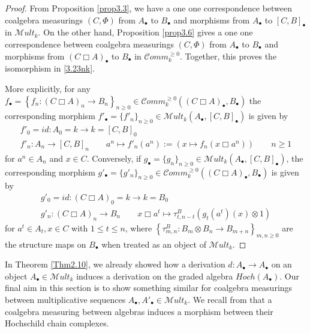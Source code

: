 \documentclass[10pt, colorlinks]{article}
\numberwithin{equation}{section} \DeclareMathSizes{2}{10}{12}{13}
\begin{document}
    \begin{proof} 
    
     From Proposition \ref{prop3.3}, we have a one one correspondence between coalgebra measurings $(C,\Phi)$ from $A_\bullet$ to $B_\bullet$ and morphisms from $A_\bullet$ to $[C,B]_\bullet$ in $\mathscr Mult_k$. On the other hand, Proposition \ref{prop3.6} gives a one one  correspondence between coalgebra measurings $(C,\Phi)$ from $A_\bullet$ to $B_\bullet$ and morphisms from $(C\Box A)_\bullet$ to $B_\bullet$ in $\mathcal Comm_k^{\geq 0}$.  Together, this proves the isomorphism in \eqref{3.23nk}. 
     
     \smallskip
      More explicitly, for any $f_\bullet=\left\{f_n:(C\Box A)_n\longrightarrow B_n\right\}_{n\geq 0}\in \mathcal Comm_k^{\geq 0}\left((C\Box A)_\bullet,B_\bullet\right)$ the corresponding morphism $f'_\bullet=\{f'_n\}_{n\geq 0}\in {\mathscr Mult_k}\left(A_\bullet, [C,B]_\bullet\right)$ is given by
     \begin{equation*}
     \begin{array}{c}
        f'_0=id:A_0=k\longrightarrow k=[C,B]_0\\
           f'_n:A_n\longrightarrow  [C,B]_n\qquad a^n\mapsto f'_n(a^n):=(x\longmapsto f_n(x\Box {a^n}))\qquad n\geq 1
     \end{array}     
     \end{equation*}
     for $a^n\in A_n$ and $x\in C$. 
    Conversely, if $g_\bullet=\{g_n\}_{n\geq 0}\in {\mathscr Mult_k}(A_\bullet, [C,B]_\bullet)$,  the corresponding morphism $g'_\bullet=\{g'_n\}_{n\geq 0}\in \mathcal Comm_k^{\geq 0}\left((C\Box A)_\bullet,B_\bullet\right)$ is  given by
     \begin{equation*}
         \begin{array}{c}
         g'_0=id:(C\Box A)_0=k\longrightarrow k=B_0 \\
            g'_n:(C\Box A)_n\longrightarrow B_n\qquad x\Box a^t\mapsto \tau^B_{t,n-t}(g_t(a^t)(x)\otimes 1)
         \end{array}
     \end{equation*}
     for $a^t\in A_t,x\in C$ with $1\leq t\leq n$, where $\left\{\tau^B_{m,n}:B_m\otimes B_n\longrightarrow B_{m+n}\right\}_{m,n\geq 0}$ are the structure maps on $B_\bullet$ when treated as an object of $\mathscr Mult_k$.  
    \end{proof}



     
     In Theorem \ref{Thm2.10}, we already showed how a derivation $d: A_\bullet\longrightarrow A_\bullet$ on an object $A_\bullet\in \mathscr{M}ult_k$ induces a derivation  on the graded algebra $Hoch(A_\bullet)$.  Our final aim in this section is to show something similar for coalgebra measurings between multiplicative sequences $A_\bullet,A'_\bullet\in \mathscr Mult_k$. We recall from \cite[Proposition 2.2]{AB} that a coalgebra measuring between algebras induces a morphism between their Hochschild chain complexes.
    
\end{document}
